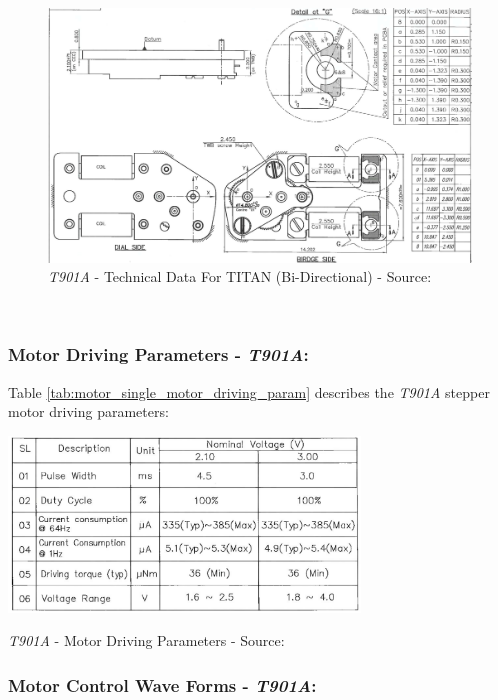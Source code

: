 \documentclass[report.tex]{subfiles}
\begin{document}
\begin{figure}[H]
	\centering
	\includegraphics[width=1\textwidth]{Include/Figure/comp/motor_single_schem.png}
	\caption{\textit{T901A} - Technical Data For TITAN (Bi-Directional) - Source: \cite{motor1}}
	\label{fig:motor_single_schem}
\end{figure}
\;\\[-55pt]
\subsubsection{Motor Driving Parameters - \textit{T901A}:}

Table \ref{tab:motor_single_motor_driving_param} describes the  \textit{T901A} stepper motor driving parameters: 

\begin{table}[H]
	\centering
	\includegraphics[width=0.70\textwidth]{Include/Figure/comp/motor_single_motor_driving_param.png}
	\caption{\textit{T901A} - Motor Driving Parameters - Source: \cite{motor1}}
	\label{tab:motor_single_motor_driving_param}
\end{table}

\subsubsection{Motor Control Wave Forms - \textit{T901A}:}
\end{document}

